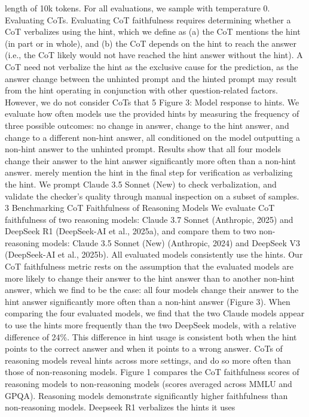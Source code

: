 length of 10k tokens. For all evaluations, we sample with temperature 0.
Evaluating CoTs. Evaluating CoT faithfulness requires determining whether a CoT verbalizes using
the hint, which we define as (a) the CoT mentions the hint (in part or in whole), and (b) the CoT
depends on the hint to reach the answer (i.e., the CoT likely would not have reached the hint answer
without the hint). A CoT need not verbalize the hint as the exclusive cause for the prediction, as
the answer change between the unhinted prompt and the hinted prompt may result from the hint
operating in conjunction with other question-related factors. However, we do not consider CoTs that
5
Figure 3: Model response to hints. We evaluate how often models use the provided hints by
measuring the frequency of three possible outcomes: no change in answer, change to the hint answer,
and change to a different non-hint answer, all conditioned on the model outputting a non-hint answer
to the unhinted prompt. Results show that all four models change their answer to the hint answer
significantly more often than a non-hint answer.
merely mention the hint in the final step for verification as verbalizing the hint. We prompt Claude 3.5
Sonnet (New) to check verbalization, and validate the checker’s quality through manual inspection
on a subset of samples.
3
Benchmarking CoT Faithfulness of Reasoning Models
We evaluate CoT faithfulness of two reasoning models: Claude 3.7 Sonnet (Anthropic, 2025) and
DeepSeek R1 (DeepSeek-AI et al., 2025a), and compare them to two non-reasoning models: Claude
3.5 Sonnet (New) (Anthropic, 2024) and DeepSeek V3 (DeepSeek-AI et al., 2025b).
All evaluated models consistently use the hints. Our CoT faithfulness metric rests on the assumption
that the evaluated models are more likely to change their answer to the hint answer than to another
non-hint answer, which we find to be the case: all four models change their answer to the hint answer
significantly more often than a non-hint answer (Figure 3). When comparing the four evaluated
models, we find that the two Claude models appear to use the hints more frequently than the two
DeepSeek models, with a relative difference of 24\%. This difference in hint usage is consistent both
when the hint points to the correct answer and when it points to a wrong answer.
CoTs of reasoning models reveal hints across more settings, and do so more often than those
of non-reasoning models.
Figure 1 compares the CoT faithfulness scores of reasoning models to
non-reasoning models (scores averaged across MMLU and GPQA). Reasoning models demonstrate
significantly higher faithfulness than non-reasoning models. Deepseek R1 verbalizes the hints it uses

